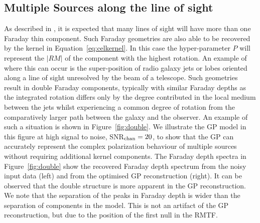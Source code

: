 \documentclass[fleqn,usenatbib]{mnras}
\begin{document}
\subsection{Multiple Sources along the line of sight}
\label{sec:multiple}

As described in \cite{Sun_2015}, it is expected that many lines of sight will have more than one Faraday thin component. Such Faraday geometries are also able to be recovered by the kernel in Equation~\ref{eq:celkernel}. In this case the hyper-parameter $P$ will represent the $|RM|$ of the component with the highest rotation. An example of where this can occur is the super-position of radio galaxy jets or lobes oriented along a line of sight unresolved by the beam of a telescope. Such geometries result in double Faraday components, typically with similar Faraday depths as the integrated rotation differs only by the degree contributed in the local medium between the jets whilst experiencing a common degree of rotation from the comparatively larger path between the galaxy and the observer. An example of such a situation is shown in Figure~\ref{fig:double}. We illustrate the GP model in this figure at high signal to noise, SNR$_{\rm chan} = 20$, to show that the GP can accurately represent the complex polarization behaviour of multiple sources without requiring additional kernel components. The Faraday depth spectra in Figure~\ref{fig:double} show the recovered Faraday depth spectrum from the noisy input data (left) and from the optimised GP reconstruction (right). It can be observed that the double structure is more apparent in the GP reconstruction. We note that the separation of the peaks in Faraday depth is wider than the separation of components in the model. This is not an artifact of the GP reconstruction, but due to the position of the first null in the RMTF.
%
\end{document}
